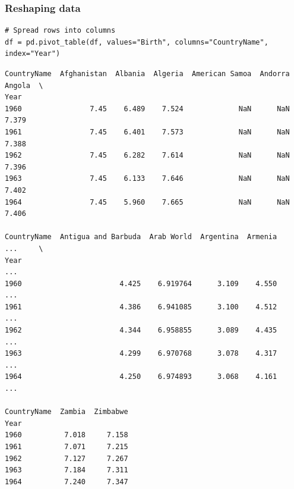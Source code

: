 \documentclass[xcolor=table]{beamer}
\begin{document}
\begin{frame}[fragile]
\frametitle{Reshaping data}

\begin{lstlisting}[style=python]
# Spread rows into columns
df = pd.pivot_table(df, values="Birth", columns="CountryName", index="Year")
\end{lstlisting}

{\fontsize{7}{7}\selectfont
\begin{verbatim}
CountryName  Afghanistan  Albania  Algeria  American Samoa  Andorra  Angola  \
Year                                                                          
1960                7.45    6.489    7.524             NaN      NaN   7.379   
1961                7.45    6.401    7.573             NaN      NaN   7.388   
1962                7.45    6.282    7.614             NaN      NaN   7.396   
1963                7.45    6.133    7.646             NaN      NaN   7.402   
1964                7.45    5.960    7.665             NaN      NaN   7.406   

CountryName  Antigua and Barbuda  Arab World  Argentina  Armenia    ...     \
Year                                                                ...      
1960                       4.425    6.919764      3.109    4.550    ...      
1961                       4.386    6.941085      3.100    4.512    ...      
1962                       4.344    6.958855      3.089    4.435    ...      
1963                       4.299    6.970768      3.078    4.317    ...      
1964                       4.250    6.974893      3.068    4.161    ...      

CountryName  Zambia  Zimbabwe  
Year                           
1960          7.018     7.158  
1961          7.071     7.215  
1962          7.127     7.267  
1963          7.184     7.311  
1964          7.240     7.347 
\end{verbatim}}
\end{frame}
\end{document}
